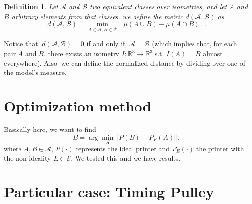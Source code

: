 \documentclass[conference]{IEEEtran}
\newtheorem{definition}{Definition}
\newcommand{\R}{\mathbb{R}}
\begin{document}
\begin{definition}
Let $\mathcal{A}$ and $\mathcal{B}$ two equivalent classes over isometries, and let $A$ and $B$ arbitrary elements from that classes, we define the metric $d(\mathcal{A},\mathcal{B})$ as
\begin{equation}
d(\mathcal{A},\mathcal{B})=\min_{A\in\mathcal{A},B\in\mathcal{B}}\left[\mu(A\cup B)-\mu(A\cap B)\right].
\end{equation}
\end{definition}
Notice that, $d(\mathcal{A},\mathcal{B})=0$ if and only if, $\mathcal{A}=\mathcal{B}$ (which implies that, for each pair $A$ and $B$, there exists an isometry $I:\R^3\to\R^3$ s.t. $I(A)=B$ almost everywhere). Also, we can define the normalized distance by dividing over one of the model's measure.

{\color{blue}
\section{Optimization method}

Basically here, we want to find
\begin{equation}
B=\arg\min_{\mathcal{A}}||P(B)-P_E(A)||,
\end{equation}
where $A,B\in\mathcal{A}$, $P(\cdot)$ represents the ideal printer and $P_E(\cdot)$ the printer with the non-ideality $E\in\mathcal{E}$. We tested this and we have results.}

\section{Particular case: Timing Pulley}
\end{document}
